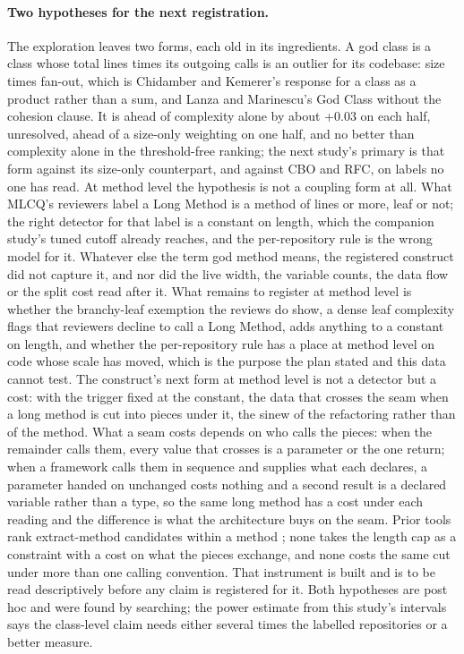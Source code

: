 \documentclass[11pt,a4paper]{article}
\begin{document}
\paragraph{Two hypotheses for the next registration.} The exploration leaves
two forms, each old in its ingredients. A god class is a class whose total
lines times its outgoing calls is an outlier for its codebase: size times
fan-out, which is Chidamber and Kemerer's response for a class as a product
rather than a sum, and Lanza and Marinescu's God Class without the cohesion
clause. It is ahead of complexity alone by about +0.03 on each half, unresolved,
ahead of a size-only weighting on one half, and no better than complexity
alone in the threshold-free ranking; the next study's
primary is that form against its size-only counterpart, and against CBO and
RFC, on labels no one has read. At method level the hypothesis is not a coupling form at all. What
MLCQ's reviewers label a Long Method is a method of \lwLengthCutoff{}
lines or more, leaf or not; the right detector for that label is a
constant on length, which the companion study's tuned cutoff already
reaches, and the per-repository rule is the wrong model for it. Whatever
else the term god method means, the registered construct did not capture
it, and nor did the live width, the variable counts, the data flow or the
split cost read after it. What remains to register at method level is
whether the branchy-leaf exemption the reviews do show, a dense leaf
complexity flags that reviewers decline to call a Long Method, adds
anything to a constant on length, and whether the per-repository rule has
a place at method level on code whose scale has moved, which is the purpose
the plan stated and this data cannot test. The construct's next form at
method level is not a detector but a cost: with the trigger fixed at the
constant, the data that crosses the seam when a long method is cut into
pieces under it, the sinew of the refactoring rather than of the method.
What a seam costs depends on who calls the pieces: when the remainder calls
them, every value that crosses is a parameter or the one return; when a
framework calls them in sequence and supplies what each declares, a
parameter handed on unchanged costs nothing and a second result is a
declared variable rather than a type, so the same long method has a cost
under each reading and the difference is what the architecture buys on the
seam. Prior tools rank extract-method candidates within a method
\cite{tsantalis2011, haas2016}; none takes the length cap as a constraint
with a cost on what the pieces exchange, and none costs the same cut under
more than one calling convention. That instrument is built and is to be
read descriptively before any claim is registered for it.
Both hypotheses are post hoc and were found by searching; the power
estimate from this study's intervals says the class-level claim needs
either several times the labelled repositories or a better measure.
\end{document}
